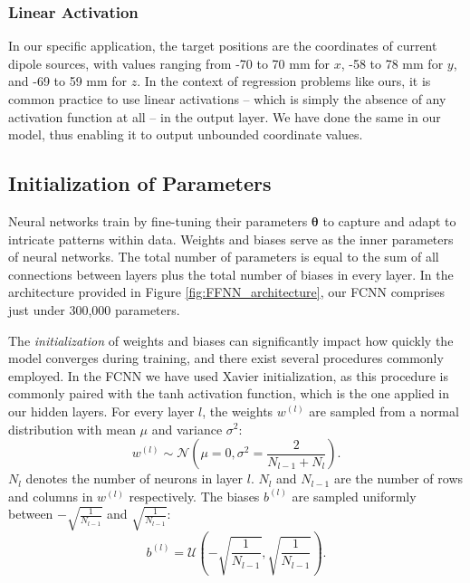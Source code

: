 \documentclass[a4paper, UKenglish, 11pt]{uiomaster}
\begin{document}
\subsubsection{Linear Activation}

In our specific application, the target positions are the coordinates of current dipole sources, with values ranging from -70 to 70 mm for $x$, -58 to 78 mm for $y$, and -69 to 59 mm for $z$.
In the context of regression problems like ours, it is common practice to use linear activations -- which is simply the absence of any activation function at all -- in the output layer. We have done the same in our model, thus enabling it to output unbounded coordinate values.



\subsection{Initialization of Parameters}


Neural networks train by fine-tuning their parameters \(\boldsymbol \theta\) to capture and adapt to intricate patterns within data. Weights and biases serve as the inner parameters of neural networks. The total number of parameters is equal to the sum of all connections between layers plus the total number of biases in every layer. In the architecture provided in Figure \ref{fig:FFNN_architecture}, our FCNN comprises just under 300,000 parameters.

The \emph{initialization} of weights and biases can significantly impact how quickly the model converges during training, and there exist several procedures commonly employed. In the FCNN we have used Xavier initialization, as this procedure is commonly paired with the tanh activation function, which is the one applied in our hidden layers. For every layer $l$, the weights $w^{(l)}$ are sampled from a normal distribution with mean \(\mu\) and variance \(\sigma^2\):
\begin{equation}
  w^{(l)} \sim \mathcal{N} \left( \mu=0, \sigma^2 = \frac{2}{N_{l-1} + N_l} \right).
\end{equation}
\(N_l\) denotes the number of neurons in layer \(l\).
\(N_l\) and \(N_{l - 1}\) are the number of rows and columns in \(w^{(l)}\) respectively.
The biases \(b^{(l)}\) are sampled uniformly between
\(- \sqrt{\frac{1}{N_{l - 1}}}\)
and
\(\sqrt{\frac{1}{N_{l - 1}}}\):
\begin{equation}
  b^{(l)} = \mathcal U \left( - \sqrt{\frac{1}{N_{l - 1}}}, \sqrt{\frac{1}{N_{l - 1}}} \right).
\end{equation}
\end{document}
